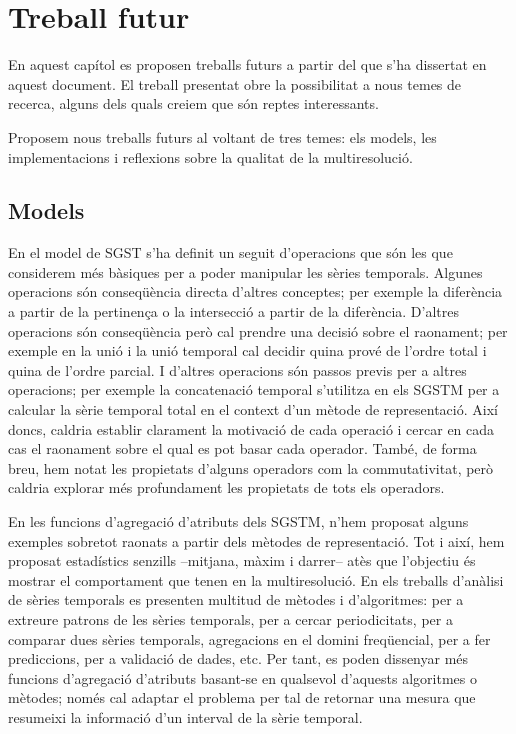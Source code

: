 \chapter{Treball futur}
\label{sec:futur}


En aquest capítol es proposen treballs futurs a partir del que s'ha
dissertat en aquest document. El treball presentat obre la
possibilitat a nous temes de recerca, alguns dels quals creiem que són
reptes interessants. 


Proposem nous treballs futurs al voltant de tres temes: els models,
les implementacions i reflexions sobre la qualitat de la
multiresolució.


\section{Models}



En el model de \gls{SGST} s'ha definit un seguit d'operacions que són
les que considerem més bàsiques per a poder manipular les sèries
temporals. Algunes operacions són conseqüència directa d'altres
conceptes; per exemple la diferència a partir de la pertinença o la
intersecció a partir de la diferència. D'altres operacions són
conseqüència però cal prendre una decisió sobre el raonament; per
exemple en la unió i la unió temporal cal decidir quina prové de
l'ordre total i quina de l'ordre parcial.  I d'altres operacions són
passos previs per a altres operacions; per exemple la concatenació
temporal s'utilitza en els \gls{SGSTM} per a calcular la sèrie
temporal total en el context d'un mètode de representació.  Així
doncs, caldria establir clarament la motivació de cada operació i
cercar en cada cas el raonament sobre el qual es pot basar cada
operador. També, de forma breu, hem notat les propietats d'alguns
operadors com la commutativitat, però caldria explorar més
profundament les propietats de tots els operadors.


En les funcions d'agregació d'atributs dels \gls{SGSTM}, n'hem
proposat alguns exemples sobretot raonats a partir dels mètodes de
representació. Tot i així, hem proposat estadístics senzills
--mitjana, màxim i darrer-- atès que l'objectiu és mostrar el
comportament que tenen en la multiresolució.  En els treballs
d'anàlisi de sèries temporals es presenten multitud de mètodes i
d'algoritmes: per a extreure patrons de les sèries temporals, per a
cercar periodicitats, per a comparar dues sèries temporals,
agregacions en el domini freqüencial, per a fer prediccions, per a
validació de dades, etc. Per tant, es poden dissenyar més funcions
d'agregació d'atributs basant-se en qualsevol d'aquests algoritmes o
mètodes; només cal adaptar el problema per tal de retornar una mesura
que resumeixi la informació d'un interval de la sèrie temporal.



